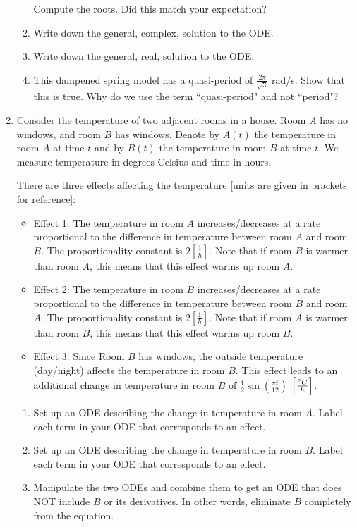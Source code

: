 \begin{enumerate}
\begin{enumerate}
        Compute the roots. Did this match your expectation?

        \item Write down the general, complex, solution to the ODE.

        \item Write down the general, real, solution to the ODE.

        \item This dampened spring model has a quasi-period of $\frac{2\pi}{\sqrt{3}}$ rad/s. Show that this is true. Why do we use the term ``quasi-period" and not ``period"?
    \end{enumerate}
    

    \item 
    Consider the temperature of two adjacent rooms in a house. Room $A$ has no windows, and room $B$ has windows. Denote by $A(t)$ the temperature in room $A$ at time $t$ and by $B(t)$ the temperature in room $B$ at time $t$. We measure temperature in degrees Celsius and time in hours.
    
    There are three effects affecting the temperature [units are given in brackets for reference]:
    \begin{itemize}[nosep,itemsep=2mm,topsep=2mm]
    	\item Effect 1: The temperature in room $A$ increases/decreases at a rate proportional to the difference in temperature between room $A$ and room $B$. The proportionality constant is $2\left[\frac{1}{h}\right]$. Note that if room $B$ is warmer than room $A$, this means that this effect warms up room $A$.
    	\item Effect 2: The temperature in room $B$ increases/decreases at a rate proportional to the difference in temperature between room $B$ and room $A$. The proportionality constant is $2\left[\frac{1}{h}\right]$. Note that if room $A$ is warmer than room $B$, this means that this effect warms up room $B$.
    	\item Effect 3: Since Room $B$ has windows, the outside temperature (day/night) affects the temperature in room $B$. This effect leads to an additional change in temperature in room $B$ of $\frac12\sin \left(\frac{\pi t}{12}\right)$ $\left[\frac{\degree C}{h}\right]$.
    \end{itemize}

\begin{enumerate}
	\item Set up an ODE describing the change in temperature in room $A$.
     Label each term in your ODE that corresponds to an effect.
    \item Set up an ODE describing the change in temperature in room $B$.
     Label each term in your ODE that corresponds to an effect.
    \item Manipulate the two ODEs and combine them to get an ODE that does NOT include $B$ or its derivatives. In other words, eliminate $B$ completely from the equation.


\end{enumerate}
\end{enumerate}

